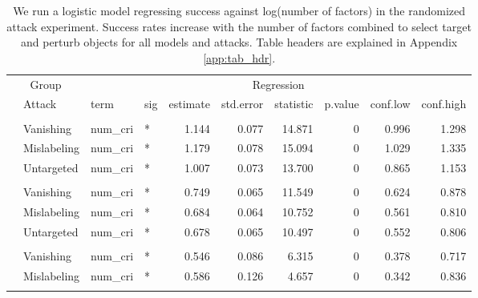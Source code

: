 \documentclass[
]{article}
\begin{document}
\begin{longtable}[t]{llllrrrrrr}
\caption{\label{tab:num_cri_table}We run a logistic model regressing success against log(number of factors) in the randomized attack experiment. Success rates increase with the number of factors combined to select target and perturb objects for all models and attacks. Table headers are explained in Appendix \ref{app:tab_hdr}.}\\
\toprule
\multicolumn{2}{c}{Group} & \multicolumn{8}{c}{Regression} \\
\cmidrule(l{3pt}r{3pt}){1-2} \cmidrule(l{3pt}r{3pt}){3-10}
 & Attack & term & sig & estimate & std.error & statistic & p.value & conf.low & conf.high\\
\midrule
\addlinespace[0.3em]
\multicolumn{10}{l}{\textbf{YOLOv3}}\\
\hspace{1em} & Vanishing & num\_cri & * & 1.144 & 0.077 & 14.871 & 0 & 0.996 & 1.298\\
\cmidrule{2-10}\nopagebreak
\hspace{1em} & Mislabeling & num\_cri & * & 1.179 & 0.078 & 15.094 & 0 & 1.029 & 1.335\\
\cmidrule{2-10}\nopagebreak
\hspace{1em} & Untargeted & num\_cri & * & 1.007 & 0.073 & 13.700 & 0 & 0.865 & 1.153\\
\cmidrule{1-10}\pagebreak[0]
\addlinespace[0.3em]
\multicolumn{10}{l}{\textbf{SSD}}\\
\hspace{1em} & Vanishing & num\_cri & * & 0.749 & 0.065 & 11.549 & 0 & 0.624 & 0.878\\
\cmidrule{2-10}\nopagebreak
\hspace{1em} & Mislabeling & num\_cri & * & 0.684 & 0.064 & 10.752 & 0 & 0.561 & 0.810\\
\cmidrule{2-10}\nopagebreak
\hspace{1em} & Untargeted & num\_cri & * & 0.678 & 0.065 & 10.497 & 0 & 0.552 & 0.806\\
\cmidrule{1-10}\pagebreak[0]
\addlinespace[0.3em]
\multicolumn{10}{l}{\textbf{RetinaNet}}\\
\hspace{1em} & Vanishing & num\_cri & * & 0.546 & 0.086 & 6.315 & 0 & 0.378 & 0.717\\
\cmidrule{2-10}\nopagebreak
\hspace{1em} & Mislabeling & num\_cri & * & 0.586 & 0.126 & 4.657 & 0 & 0.342 & 0.836\\
\cmidrule{2-10}\nopagebreak

\end{longtable}
\end{document}
